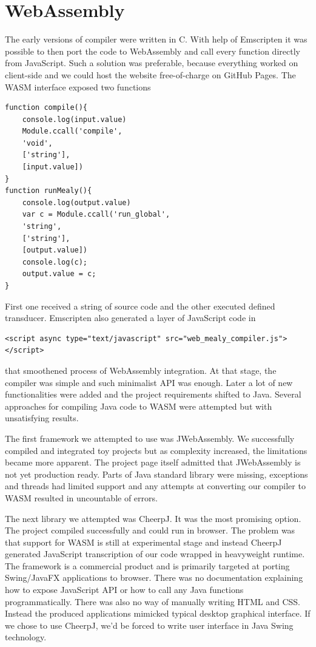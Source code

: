\section{WebAssembly}

The early versions of compiler were written in C. With help of Emscripten it was possible to then port the code to WebAssembly and call every function directly from JavaScript. Such a solution was preferable, because everything worked on client-side and we could host the website free-of-charge on GitHub
Pages. The WASM interface exposed two functions
\begin{lstlisting}
function compile(){
	console.log(input.value)
	Module.ccall('compile',
	'void',
	['string'], 
	[input.value])
}
function runMealy(){
	console.log(output.value)
	var c = Module.ccall('run_global',
	'string',
	['string'], 
	[output.value])
	console.log(c);
	output.value = c;
}
\end{lstlisting}
First one received a string of source code and the other executed defined transducer. 
Emscripten also generated a layer of JavaScript code in
\begin{lstlisting}
<script async type="text/javascript" src="web_mealy_compiler.js"></script>
\end{lstlisting}
that smoothened process of WebAssembly integration.
At that stage, the compiler was simple and such minimalist API was enough. Later a lot of new functionalities were added and the project requirements shifted to Java. Several approaches for compiling Java code to WASM were attempted but with unsatisfying results.

The first framework we attempted to use was JWebAssembly. We successfully compiled and integrated toy projects but as complexity increased, the limitations became more apparent. The project page itself admitted that JWebAssembly is not yet production ready. Parts of Java standard library were missing, exceptions and threads had limited support and any attempts at converting our compiler to WASM resulted in uncountable of errors.

The next library we attempted was CheerpJ. It was the most promising option. The project compiled successfully and could run in browser. The problem was that support for WASM is still at experimental stage and instead CheerpJ generated JavaScript transcription of our code wrapped in heavyweight runtime. The framework is a commercial product and is primarily targeted at porting Swing/JavaFX applications to browser. There was no documentation explaining how to expose JavaScript API or how to call any Java functions programmatically. There was also no way of manually writing HTML and CSS. Instead the produced applications mimicked typical desktop graphical interface. If we chose to use CheerpJ, we'd be forced to write user interface in Java Swing technology.

